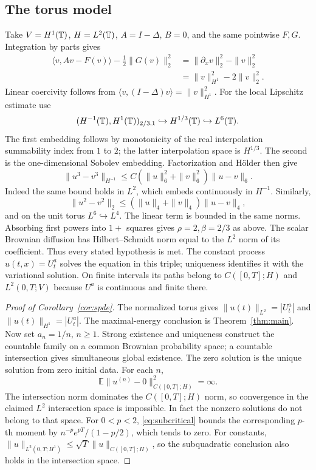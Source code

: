 \documentclass[11pt]{article}
\theoremstyle{remark}\newtheorem{remark}[theorem]{Remark}
\newcommand{\E}{\mathbb E}\newcommand{\Pp}{\mathbb P}
\begin{document}
\subsection{The torus model}
Take $V=H^1(\mathbb T)$, $H=L^2(\mathbb T)$, $A=I-\Delta$, $B=0$, and the same pointwise $F,G$. Integration by parts gives
\begin{align*}
 \langle v,Av-F(v)\rangle-\tfrac12\|G(v)\|_2^2
 &=\|\partial_xv\|_2^2-\|v\|_2^2\\
 &=\|v\|_{H^1}^2-2\|v\|_2^2.
\end{align*}
Linear coercivity follows from $\langle v,(I-\Delta)v\rangle=\|v\|_{H^1}^2$. For the local Lipschitz estimate use
\[
 (H^{-1}(\mathbb T),H^1(\mathbb T))_{2/3,1}
 \hookrightarrow H^{1/3}(\mathbb T)\hookrightarrow L^6(\mathbb T).
\]
The first embedding follows by monotonicity of the real interpolation summability index from $1$ to $2$; the latter interpolation space is $H^{1/3}$. The second is the one-dimensional Sobolev embedding. Factorization and H\"older then give
\[
 \|u^3-v^3\|_{H^{-1}}
 \le C(\|u\|_6^2+\|v\|_6^2)\|u-v\|_6.
\]
Indeed the same bound holds in $L^2$, which embeds continuously in $H^{-1}$. Similarly,
\[
 \|u^2-v^2\|_2
 \le(\|u\|_4+\|v\|_4)\|u-v\|_4,
\]
and on the unit torus $L^6\hookrightarrow L^4$. The linear term is bounded in the same norms. Absorbing first powers into $1+$ squares gives $\rho=2,\beta=2/3$ as above. The scalar Brownian diffusion has Hilbert--Schmidt norm equal to the $L^2$ norm of its coefficient. Thus every stated hypothesis is met. The constant process $u(t,x)=U_t^a$ solves the equation in this triple; uniqueness identifies it with the variational solution. On finite intervals its paths belong to $C([0,T];H)$ and $L^2(0,T;V)$ because $U^a$ is continuous and finite there.

\begin{proof}[Proof of Corollary~\ref{cor:spde}]
The normalized torus gives $\|u(t)\|_{L^2}=|U_t^a|$ and $\|u(t)\|_{H^1}=|U_t^a|$. The maximal-energy conclusion is Theorem~\ref{thm:main}. Now set $a_n=1/n$, $n\ge1$. Strong existence and uniqueness construct the countable family on a common Brownian probability space; a countable intersection gives simultaneous global existence. The zero solution is the unique solution from zero initial data. For each $n$,
\[
 \E\|u^{(n)}-0\|_{C([0,T];H)}^2=\infty.
\]
The intersection norm dominates the $C([0,T];H)$ norm, so convergence in the claimed $L^2$ intersection space is impossible. In fact the nonzero solutions do not belong to that space. For $0<p<2$, \eqref{eq:subcritical} bounds the corresponding $p$-th moment by $n^{-p}e^{pT}/(1-p/2)$, which tends to zero. For constants, $\|u\|_{L^2(0,T;H^1)}\le\sqrt T\|u\|_{C([0,T];H)}$, so the subquadratic conclusion also holds in the intersection space.
\end{proof}
\end{document}

